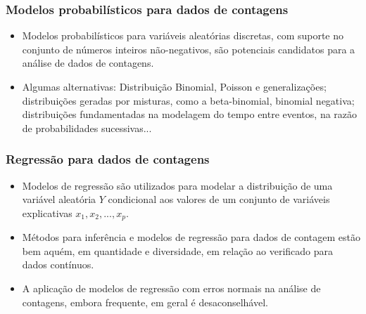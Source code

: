 \documentclass[10pt, aspectratio=169]{beamer}
\begin{document}


\begin{frame}\frametitle{Modelos probabilísticos para dados de contagens}

\begin{itemize}
    \item Modelos probabilísticos para variáveis aleatórias discretas, com suporte no conjunto de números inteiros não-negativos, são potenciais candidatos para a análise de dados de contagens.
    
\vspace{0.5cm}    
    
    \item Algumas alternativas: Distribuição Binomial, Poisson e generalizações; distribuições geradas por misturas, como a beta-binomial, binomial negativa; distribuições fundamentadas na modelagem do tempo entre eventos, na razão de probabilidades sucessivas...
    
   
\end{itemize}
\end{frame}



\begin{frame}\frametitle{Regressão para dados de contagens}

\begin{itemize}

\item Modelos de regressão são utilizados para modelar a distribuição de uma variável aleatória $Y$ condicional aos valores de um conjunto de variáveis explicativas $x_{1},x_{2},...,x_{p}$.

\vspace{0,5cm}

\item Métodos para inferência e modelos de regressão para dados de contagem estão bem
aquém, em quantidade e diversidade, em relação ao verificado para dados contínuos.

\vspace{0,5cm}

\item A aplicação de modelos de regressão com erros normais na análise de contagens, embora frequente, em geral é desaconselhável.

\end{itemize}
\end{frame}
\end{document}

